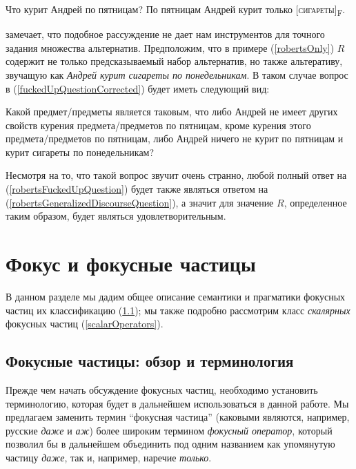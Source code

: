 \documentclass[a4paper, titlepage]{article}
\begin{document}
\begin{exe}
    \ex \label{robertsGeneralizedDiscourse} \begin{xlist}
            \ex \label{robertsGeneralizedDiscourseQuestion} Что курит Андрей по пятницам?
            \ex \label{robertsGeneralizedDiscourseAnswer} По пятницам Андрей курит только [\textsc{сигареты}]\textsubscript{F}.
    \end{xlist}
\end{exe}

\citep{kadmon2001formal} замечает, что подобное рассуждение не дает нам инструментов для точного задания множества альтернатив. Предположим, что в примере (\ref{robertsOnly}) $ R $ содержит не только предсказываемый \citep{roberts1996information} набор альтернатив, но также альтеративу, звучащую как \textit{Андрей курит сигареты по понедельникам}. В таком случае вопрос в (\ref{fuckedUpQuestionCorrected}) будет иметь следующий вид:

\begin{exe}
    \ex \label{robertsFuckedUpQuestion} Какой предмет/предметы является таковым, что либо Андрей не имеет других свойств курения предмета/предметов по пятницам, кроме курения этого предмета/предметов по пятницам, либо Андрей ничего не курит по пятницам и курит сигареты по понедельникам?
\end{exe}

Несмотря на то, что такой вопрос звучит очень странно, любой полный ответ на (\ref{robertsFuckedUpQuestion}) будет также являться ответом на (\ref{robertsGeneralizedDiscourseQuestion}), а значит для \citep{roberts1996information} значение $ R $, определенное таким образом, будет являться удовлетворительным.

\section{Фокус и фокусные частицы}

В данном разделе мы дадим общее описание семантики и прагматики фокусных частиц их классификацию (\ref{focusParticles}); мы также подробно рассмотрим класс \textit{скалярных} фокусных частиц (\ref{scalarOperators}).

\subsection{Фокусные частицы: обзор и терминология} \label{focusParticles}

Прежде чем начать обсуждение фокусных частиц, необходимо установить терминологию, которая будет в дальнейшем использоваться в данной работе. Мы предлагаем заменить термин ``фокусная частица'' (каковыми являются, например, русские \textit{даже} и \textit{аж}) более широким термином \textit{фокусный оператор}, который позволил бы в дальнейшем объединить под одним названием как упомянутую частицу \textit{даже}, так и, например, наречие \textit{только}.
\end{document}
